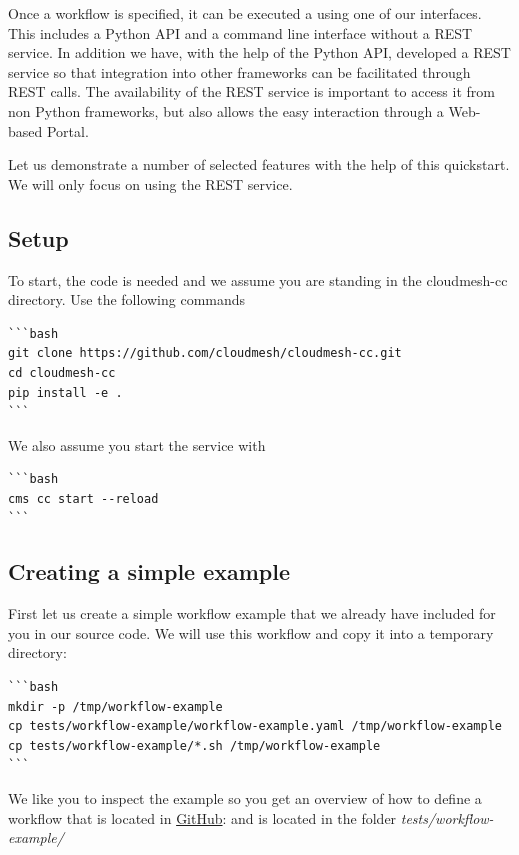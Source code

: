 Once a workflow is specified, it can be executed a using one of our
interfaces. This includes a Python API and a command line interface
without a REST service. In addition we have, with the help of the Python
API, developed a REST service so that integration into other frameworks
can be facilitated through REST calls. The availability of the REST
service is important to access it from non Python frameworks, but also
allows the easy interaction through a Web-based Portal.

Let us demonstrate a number of selected features with the help of this
quickstart. We will only focus on using the REST service.

\subsection{Setup}\label{setup}

To start, the code is needed and we assume you are standing in the
cloudmesh-cc directory. Use the following commands

\begin{verbatim}
```bash
git clone https://github.com/cloudmesh/cloudmesh-cc.git
cd cloudmesh-cc
pip install -e .
```
\end{verbatim}

We also assume you start the service with

\begin{verbatim}
```bash
cms cc start --reload
```
\end{verbatim}

\subsection{Creating a simple example}\label{creating-a-simple-example}

First let us create a simple workflow example that we already have
included for you in our source code. We will use this workflow and copy
it into a temporary directory:

\begin{verbatim}
```bash
mkdir -p /tmp/workflow-example
cp tests/workflow-example/workflow-example.yaml /tmp/workflow-example
cp tests/workflow-example/*.sh /tmp/workflow-example
```
\end{verbatim}

We like you to inspect the example so you get an overview of how to
define a workflow that is located in
\href{https://github.com/cloudmesh/cloudmesh-cc/tree/main/tests/workflow-example}{GitHub}:
and is located in the folder \emph{tests/workflow-example/}

